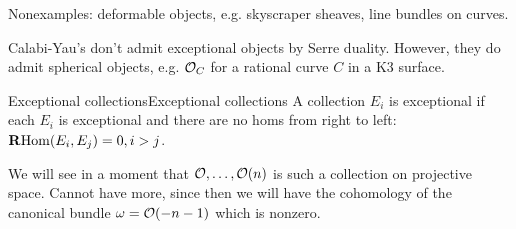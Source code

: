 
Nonexamples: deformable objects, e.g. skyscraper sheaves, line bundles on curves.

\begin{remark}{}{}
    Calabi-Yau's don't admit exceptional objects by Serre duality. However, they do admit spherical objects, e.g. $\mathcal{O}_C$ for a rational curve $C$ in a K3 surface.
\end{remark}

\begin{definition}{Exceptional collections}{Exceptional collections}
    A collection $E_i$ is exceptional if each $E_i$ is exceptional and there are no homs from right to left: $\operatorname{\mathbf{R} Hom}(E_i,E_j)=0, i>j$.
\end{definition}

We will see in a moment that $\mathcal{O},\dots,\mathcal{O}(n)$ is such a collection on projective space. Cannot have more, since then we will have the cohomology of the canonical bundle $\omega=\mathcal{O}(-n-1)$ which is nonzero.

